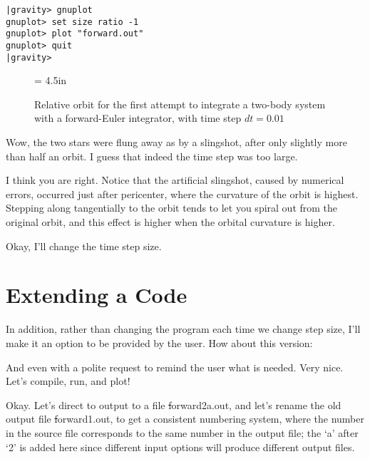 \cba

\begin{small}
\begin{verbatim}
|gravity> gnuplot
gnuplot> set size ratio -1
gnuplot> plot "forward.out"
gnuplot> quit
|gravity> 
\end{verbatim}
\end{small}

\begin{figure}[ht]
\begin{center}
\epsfxsize = 4.5in
\caption[Two-body orbit with a forward-Euler integrator, time step $dt = 0.01$]
{Relative orbit for the first attempt to integrate a two-body system with a
forward-Euler integrator, with time step $dt = 0.01$}
\label{fig:forward1}
\end{center}
\end{figure}

\abc

\bob
Wow, the two stars were flung away as by a slingshot, after only
slightly more than half an orbit.  I guess that indeed the time step
was too large.

\alice
I think you are right.  Notice that the artificial slingshot, caused
by numerical errors, occurred just after pericenter, where the
curvature of the orbit is highest.  Stepping along tangentially to the
orbit tends to let you spiral out from the original orbit, and this
effect is higher when the orbital curvature is higher.

\carol
Okay, I'll change the time step size.

\cba

\section{Extending a Code}

\abc

\carol
In addition, rather than changing the program each time we change step
size, I'll make it an option to be provided by the user.  How about
this version:

\cba


\abc

\bob
And even with a polite request to remind the user what is needed.
Very nice.  Let's compile, run, and plot!

\carol
Okay.  Let's direct to output to a file {\st forward2a.out}, and let's
rename the old output file {\st forward1.out}, to get a consistent
numbering system, where the number in the source file corresponds to
the same number in the output file; the `a' after `2' is added here
since different input options will produce different output files.

